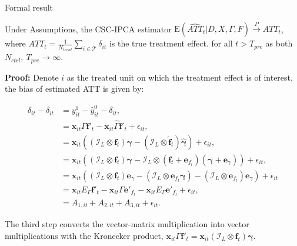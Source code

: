 \documentclass{beamer}
\begin{document}
\begin{frame}{Formal result}
\footnotesize
\begin{theorem}
\label{thm: bias}
Under Assumptions, the CSC-IPCA estimator $\mathrm{E}\left(\widehat{ATT}_{t} | D, X, \Gamma, F\right) \xrightarrow{P} ATT_{t}$, where $ATT_{t} = \frac{1}{N_{treat}}\sum_{i \in \mathcal{T}}\delta_{it}$ is the true treatment effect. for all $t > T_{pre}$ as both $N_{ctrl}, \ T_{pre} \to \infty$.
\end{theorem}

\textbf{Proof:} Denote $i$ as the treated unit on which the treatment effect is of interest, the bias of estimated ATT is given by:

\begin{equation*}
\begin{aligned}
\hat{\delta}_{it} - \delta_{it} &= y_{it}^1 - \hat{y}_{it}^0 - \delta_{it}, \\    
&= \textbf{x}_{it}\Gamma \boldsymbol{f}'_t - \textbf{x}_{it}\hat{\Gamma}\hat{\boldsymbol{f}}'_t + \epsilon_{it}, \\
&= \textbf{x}_{it}\left( \left(\mathcal{I}_L\otimes \boldsymbol{f}_t \right) \boldsymbol{\gamma} - (\mathcal{I}_L\otimes \hat{\boldsymbol{f}}_t ) \hat{\boldsymbol{\gamma}} \right) + \epsilon_{it}, \\
&= \textbf{x}_{it}\left( \left(\mathcal{I}_L\otimes \boldsymbol{f}_t \right) \boldsymbol{\gamma} - \mathcal{I}_L\otimes (\boldsymbol{f}_t + \boldsymbol{e}_{f_t}) (\boldsymbol{\gamma}+\textbf{e}_{\gamma}) \right) + \epsilon_{it}, \\
&= \textbf{x}_{it}\left( (\mathcal{I}_L \otimes \boldsymbol{f}_t) \textbf{e}_{\gamma} - (\mathcal{I}_L \otimes \boldsymbol{e}_{f_t} \boldsymbol{\gamma}) - (\mathcal{I}_L \otimes \boldsymbol{e}_{f_t}) \textbf{e}_{\gamma} \right) + \epsilon_{it}\\
&= \textbf{x}_{it}E_{\Gamma}\boldsymbol{f}'_t - \textbf{x}_{it}\Gamma \boldsymbol{e}'_{f_t} - \textbf{x}_{it}E_{\Gamma}\boldsymbol{e}'_{f_t} + \epsilon_{it}, \\
&= A_{1,it} + A_{2,it} + A_{3,it} + \epsilon_{it}.
\end{aligned}
\end{equation*}

The third step converts the vector-matrix multiplication into vector multiplications with the Kronecker product, $\boldsymbol{x}_{it}\Gamma\boldsymbol{f}'_t = \boldsymbol{x}_{it}(\mathcal{I}_L \otimes \boldsymbol{f}_t)\boldsymbol{\gamma}$.
\end{frame}
\end{document}
